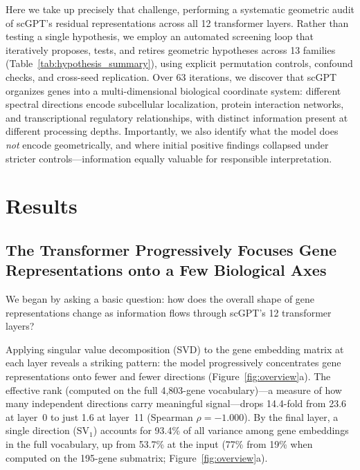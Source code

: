 \documentclass[10pt,twocolumn]{article}
\newcommand{\SV}[1]{\mathrm{SV}_{#1}}
\begin{document}
Here we take up precisely that challenge, performing a systematic geometric audit of scGPT's residual representations across all 12 transformer layers.
Rather than testing a single hypothesis, we employ an automated screening loop that iteratively proposes, tests, and retires geometric hypotheses across 13 families (Table~\ref{tab:hypothesis_summary}), using explicit permutation controls, confound checks, and cross-seed replication.
Over 63 iterations, we discover that scGPT organizes genes into a multi-dimensional biological coordinate system: different spectral directions encode subcellular localization, protein interaction networks, and transcriptional regulatory relationships, with distinct information present at different processing depths.
Importantly, we also identify what the model does \emph{not} encode geometrically, and where initial positive findings collapsed under stricter controls---information equally valuable for responsible interpretation.

\section{Results}

\subsection{The Transformer Progressively Focuses Gene Representations onto a Few Biological Axes}
\label{sec:spectral_collapse}

We began by asking a basic question: how does the overall shape of gene representations change as information flows through scGPT's 12 transformer layers?

Applying singular value decomposition (SVD) to the gene embedding matrix at each layer reveals a striking pattern: the model progressively concentrates gene representations onto fewer and fewer directions (Figure~\ref{fig:overview}a).
The effective rank (computed on the full 4{,}803-gene vocabulary)---a measure of how many independent directions carry meaningful signal---drops 14.4-fold from 23.6 at layer~0 to just 1.6 at layer~11 (Spearman $\rho = -1.000$).
By the final layer, a single direction ($\SV{1}$) accounts for 93.4\% of all variance among gene embeddings in the full vocabulary, up from 53.7\% at the input (77\% from 19\% when computed on the 195-gene submatrix; Figure~\ref{fig:overview}a).
\end{document}
